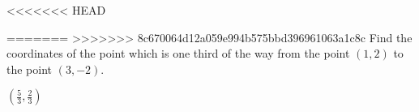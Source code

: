 
\begin{Exercise}[
name={},
title={}, 
difficulty=0,
origin={\cite{SM}}]
<<<<<<< HEAD

=======
>>>>>>> 8c670064d12a059e994b575bbd396961063a1c8c
Find the coordinates of the point which is one third of the way from the point $(1,2)$ to the point $(3,-2)$.

\end{Exercise}

\begin{Answer}
$\left(\frac{5}{3},\frac{2}{3}\right)$

\end{Answer}
